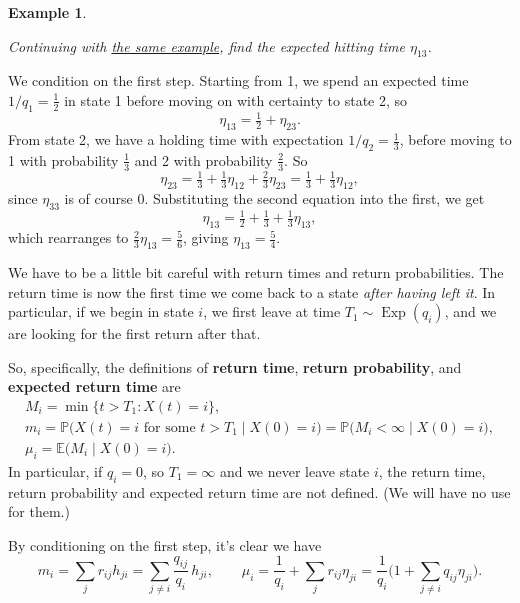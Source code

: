 \documentclass[
  a4paper,
]{article}
\theoremstyle{definition}
\theoremstyle{definition}
\newtheorem{example}{Example}[section]
\theoremstyle{definition}
\theoremstyle{remark}
\begin{document}
\begin{example}
\protect\hypertarget{exm:hitting-time-jump}{}\label{exm:hitting-time-jump}

\emph{Continuing with \protect\hyperlink{jump-classes}{the same example}, find the expected hitting time \(\eta_{13}\).}

We condition on the first step. Starting from 1, we spend an expected time \(1/q_1 = \frac12\) in state 1 before moving on with certainty to state 2, so
\[ \eta_{13} = \tfrac12 + \eta_{23} . \]
From state 2, we have a holding time with expectation \(1/q_2 = \frac13\), before moving to 1 with probability \(\frac13\) and 2 with probability \(\frac23\). So
\[ \eta_{23} = \tfrac13 + \tfrac13 \eta_{12} + \tfrac23 \eta_{23} =  \tfrac13 + \tfrac13 \eta_{12} , \]
since \(\eta_{33}\) is of course 0.
Substituting the second equation into the first, we get
\[ \eta_{13} = \tfrac12 + \tfrac13 + \tfrac13 \eta_{13} , \]
which rearranges to \(\frac23 \eta_{13} = \frac56\), giving \(\eta_{13} = \frac54\).

\end{example}

We have to be a little bit careful with return times and return probabilities. The return time is now the first time we come back to a state \emph{after having left it}. In particular, if we begin in state \(i\), we first leave at time \(T_1 \sim \operatorname{Exp}(q_i)\), and we are looking for the first return after that.

So, specifically, the definitions of \textbf{return time}, \textbf{return probability}, and \textbf{expected return time} are
\begin{gather*}
    M_i = \min \big\{t > T_1 : X(t) = i \big\} , \\
    m_i = \mathbb P\big(X(t) = i \text{ for some $t > T_1$} \mid X(0) = i \big) = \mathbb P \big( M_i < \infty \mid X(0) = i \big) ,\\
    \mu_i = \mathbb E\big( M_i \mid X(0) = i \big).
\end{gather*}
In particular, if \(q_i = 0\), so \(T_1 = \infty\) and we never leave state \(i\), the return time, return probability and expected return time are not defined. (We will have no use for them.)

By conditioning on the first step, it's clear we have
\[ m_i = \sum_j r_{ij} h_{ji} = \sum_{j \neq i} \frac{q_{ij}}{q_i} \, h_{ji}, \qquad \mu_i = \frac{1}{q_i} + \sum_j r_{ij} \eta_{ji} = \frac{1}{q_i} \bigg(1 + \sum_{j \neq i} q_{ij} \eta_{ji} \bigg). \]
\end{document}
